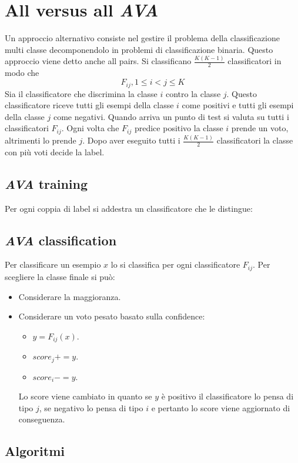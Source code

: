 \section{All versus all \emph{AVA}}
Un approccio alternativo consiste nel gestire il problema della classificazione multi classe decomponendolo in problemi di classificazione binaria.
Questo approccio viene detto anche all pairs.
Si classificano $\frac{K(K-1)}{2}$ classificatori in modo che
$$F_{ij}, 1\le i< j \le K$$
Sia il classificatore che discrimina la classe $i$ contro la classe $j$.
Questo classificatore riceve tutti gli esempi della classe $i$ come positivi e tutti gli esempi della classe $j$ come negativi.
Quando arriva un punto di test si valuta su tutti i classificatori $F_{ij}$.
Ogni volta che $F_{ij}$ predice positivo la classe $i$ prende un voto, altrimenti lo prende $j$.
Dopo aver eseguito tutti i $\frac{K(K-1)}{2}$ classificatori la classe con pi\`u voti decide la label.

	\subsection{\emph{AVA} training}
	Per ogni coppia di label si addestra un classificatore che le distingue:\\
	



	\subsection{\emph{AVA} classification}
	Per classificare un esempio $x$ lo si classifica per ogni classificatore $F_{ij}$.
	Per scegliere la classe finale si pu\`o:
	\begin{itemize}
		\item Considerare la maggioranza.
		\item Considerare un voto pesato basato sulla confidence:
			\begin{itemize}
				\item $y = F_{ij}(x)$.
				\item $score_j +=y$.
				\item $score_i -=y$.
			\end{itemize}
			Lo score viene cambiato in quanto se $y$ \`e positivo il classificatore lo pensa di tipo $j$, se negativo lo pensa di tipo $i$ e pertanto lo score viene aggiornato di conseguenza.
	\end{itemize}

	\subsection{Algoritmi}
	
	

